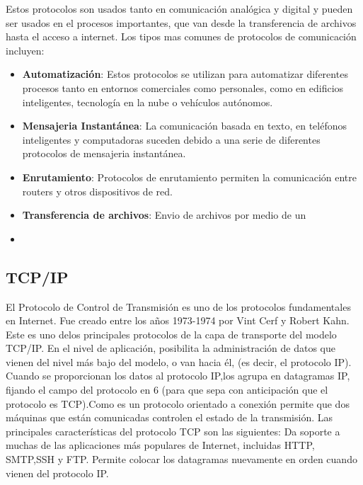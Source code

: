 Estos protocolos son usados tanto en comunicación analógica y digital y pueden ser usados en el procesos importantes, que van desde la transferencia de archivos hasta el acceso a internet. Los tipos mas comunes de protocolos de comunicación incluyen:

\begin{itemize}
    \item \textbf{Automatización}: Estos protocolos se utilizan para automatizar diferentes procesos tanto en entornos comerciales como personales, como en edificios inteligentes, tecnología en la nube o vehículos autónomos.
    \item \textbf{Mensajeria Instantánea}: La comunicación basada en texto, en teléfonos inteligentes y computadoras suceden debido a una serie de diferentes protocolos de mensajeria instantánea.
    \item \textbf{Enrutamiento}: Protocolos de enrutamiento permiten la comunicación entre routers y otros dispositivos de red.
    \item \textbf{Transferencia de archivos}: Envio de archivos por medio de un
    \item 
  
\end{itemize}

\subsection{TCP/IP}
El Protocolo de Control de Transmisión es uno de los protocolos fundamentales en Internet. Fue creado entre los años 1973-1974 por Vint Cerf y Robert Kahn. Este es uno delos principales protocolos de la capa de transporte del modelo TCP/IP. En el nivel de aplicación, posibilita la administración de datos que vienen del nivel más bajo del modelo, o van hacia él, (es decir, el protocolo IP). Cuando se proporcionan los datos al protocolo IP,los agrupa en datagramas IP, fijando el campo del protocolo en 6 (para que sepa con anticipación que el protocolo es TCP).Como es un protocolo orientado a conexión permite que dos máquinas que están comunicadas controlen el estado de la transmisión. Las principales características del protocolo TCP son las siguientes: Da soporte a muchas de las aplicaciones más populares de Internet, incluidas HTTP, SMTP,SSH y FTP. Permite colocar los datagramas nuevamente en orden cuando vienen del protocolo IP.

